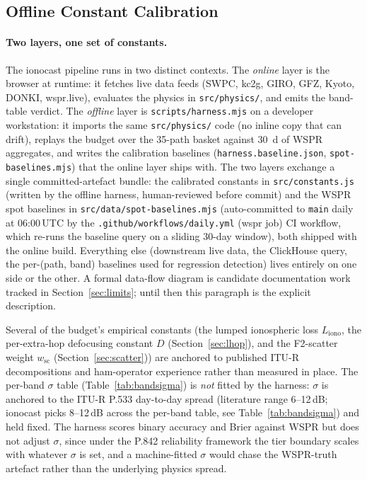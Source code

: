 \documentclass[11pt,a4paper]{article}
\begin{document}
\subsection{Offline Constant Calibration}\label{sec:calibrate}

\paragraph{Two layers, one set of constants.}  The ionocast pipeline
runs in two distinct contexts.  The \emph{online} layer is the
browser at runtime: it fetches live data feeds (SWPC, kc2g, GIRO,
GFZ, Kyoto, DONKI, wspr.live), evaluates the physics in
\texttt{src/physics/}, and emits the band-table verdict.  The
\emph{offline} layer is \texttt{scripts/harness.mjs} on a
developer workstation: it imports the same \texttt{src/physics/}
code (no inline copy that can drift), replays the budget over the
35-path basket against 30~d of WSPR aggregates, and writes the
calibration baselines (\texttt{harness.baseline.json},
\texttt{spot-baselines.mjs}) that the online layer ships with.
The two layers exchange a single committed-artefact bundle: the
calibrated constants in \texttt{src/constants.js} (written by the
offline harness, human-reviewed before commit) and the WSPR
spot baselines in \texttt{src/data/spot-baselines.mjs}
(auto-committed to \texttt{main} daily at 06:00\,UTC by the
\texttt{.github/workflows/daily.yml} (wspr job) CI workflow,
which re-runs the baseline query on a sliding 30-day window),
both shipped with the online
build.  Everything else
(downstream live data, the ClickHouse query, the per-(path, band)
baselines used for regression detection) lives entirely on one
side or the other.  A formal data-flow diagram is candidate
documentation work tracked in Section~\ref{sec:limits}; until
then this paragraph is the explicit description.

Several of the budget's empirical constants (the lumped ionospheric
loss $L_{\text{iono}}$, the per-extra-hop defocusing constant $D$
(Section~\ref{sec:lhop}), and the F2-scatter weight $w_{\text{sc}}$
(Section~\ref{sec:scatter})) are anchored to published
ITU-R decompositions and ham-operator experience rather than measured
in place. The per-band $\sigma$ table (Table~\ref{tab:bandsigma}) is
\emph{not} fitted by the harness: $\sigma$ is anchored to the
ITU-R P.533 day-to-day spread (literature range 6--12\,dB; ionocast
picks 8--12\,dB across the per-band table, see
Table~\ref{tab:bandsigma}) and held fixed. The harness scores binary accuracy and Brier against WSPR but
does not adjust $\sigma$, since under the P.842 reliability framework
the tier boundary scales with whatever $\sigma$ is set, and a
machine-fitted $\sigma$ would chase the WSPR-truth artefact rather
than the underlying physics spread.
\end{document}
